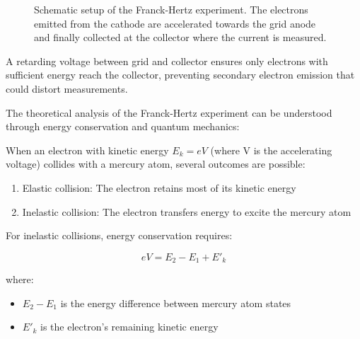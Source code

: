 \documentclass[
  a4paper,
]{book}
\providecommand{\tightlist}{%
  \setlength{\itemsep}{0pt}\setlength{\parskip}{0pt}}
\begin{document}
\begin{figure}


\caption{\label{fig-frank-hertz}Schematic setup of the Franck-Hertz
experiment. The electrons emitted from the cathode are accelerated
towards the grid anode and finally collected at the collector where the
current is measured.}

\end{figure}%

A retarding voltage between grid and collector ensures only electrons
with sufficient energy reach the collector, preventing secondary
electron emission that could distort measurements.

The theoretical analysis of the Franck-Hertz experiment can be
understood through energy conservation and quantum mechanics:

When an electron with kinetic energy \(E_k = eV\) (where V is the
accelerating voltage) collides with a mercury atom, several outcomes are
possible:

\begin{enumerate}
\def\labelenumi{\arabic{enumi}.}
\tightlist
\item
  Elastic collision: The electron retains most of its kinetic energy
\item
  Inelastic collision: The electron transfers energy to excite the
  mercury atom
\end{enumerate}

For inelastic collisions, energy conservation requires:

\[eV = E_2 - E_1 + E'_k\]

where:

\begin{itemize}
\tightlist
\item
  \(E_2 - E_1\) is the energy difference between mercury atom states
\item
  \(E'_k\) is the electron's remaining kinetic energy
\end{itemize}
\end{document}
